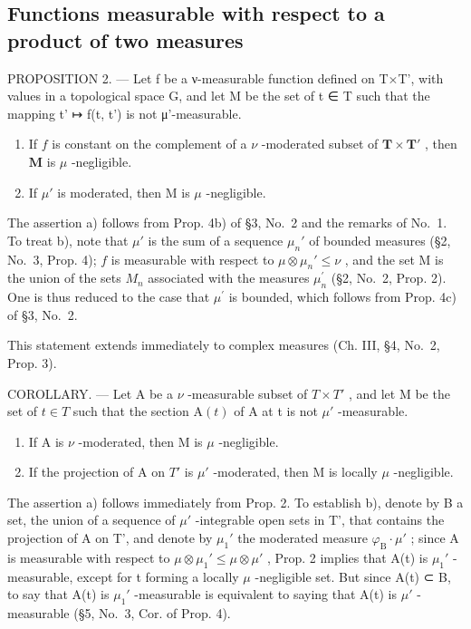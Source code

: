 \subsection{Functions measurable with respect to a product of two measures}

PROPOSITION 2. --- Let f be a ν-measurable function defined on T×T', with values in a topological space G, and let M be the set of t ∈ T such that the mapping t' ↦ f(t, t') is not μ'-measurable.

\begin{enumerate}
\def\labelenumi{\alph{enumi})}
\item
  If \(f\) is constant on the complement of a \(\nu\) -moderated subset of \(\mathbf{T} \times \mathbf{T}'\) , then \(\mathbf{M}\) is \(\mu\) -negligible.
\item
  If \(\mu'\) is moderated, then M is \(\mu\) -negligible.
\end{enumerate}

The assertion a) follows from Prop. 4b) of §3, No.~2 and the remarks of No.~1. To treat b), note that \(\mu'\) is the sum of a sequence \(\mu_n'\) of bounded measures (§2, No.~3, Prop. 4); \(f\) is measurable with respect to \(\mu \otimes \mu_n' \leqslant \nu\) , and the set M is the union of the sets \(M_{n}\) associated with the measures \(\mu_{n}^{\prime}\) (§2, No.~2, Prop. 2). One is thus reduced to the case that \(\mu^{\prime}\) is bounded, which follows from Prop. 4c) of §3, No.~2.

This statement extends immediately to complex measures (Ch. III, §4, No.~2, Prop. 3).

COROLLARY. --- Let A be a \(\nu\) -measurable subset of \(T \times T'\) , and let M be the set of \(t \in T\) such that the section \(\mathrm{A}(t)\) of A at t is not \(\mu'\) -measurable.

\begin{enumerate}
\def\labelenumi{\alph{enumi})}
\item
  If A is \(\nu\) -moderated, then M is \(\mu\) -negligible.
\item
  If the projection of A on \(T'\) is \(\mu'\) -moderated, then M is locally \(\mu\) -negligible.
\end{enumerate}

The assertion a) follows immediately from Prop. 2. To establish b), denote by B a set, the union of a sequence of \(\mu'\) -integrable open sets in T', that contains the projection of A on T', and denote by \(\mu_1'\) the moderated measure \(\varphi_{\mathrm{B}} \cdot \mu'\) ; since A is measurable with respect to \(\mu \otimes \mu_1' \leqslant \mu \otimes \mu'\) , Prop. 2 implies that A(t) is \(\mu_1'\) -measurable, except for t forming a locally \(\mu\) -negligible set. But since A(t) ⊂ B, to say that A(t) is \(\mu_1'\) -measurable is equivalent to saying that A(t) is \(\mu'\) -measurable (§5, No.~3, Cor. of Prop. 4).

